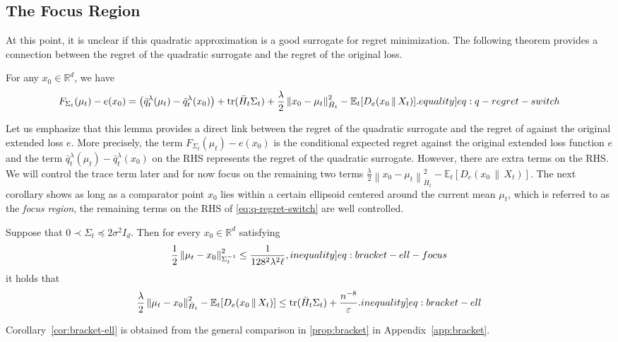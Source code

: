\documentclass[12pt,cleveref]{jmlr}
\newcommand{\eqlabel}[1]{\label[equality]{#1}}
\newcommand{\ineqlabel}[1]{\label[inequality]{#1}}
\newcommand{\R}{\mathbb R}
\newcommand{\E}{\mathbb E}
\newcommand{\tr}{\operatorname{tr}}
\newcommand{\1}{\mathbf 1}
\newcommand{\eps}{\varepsilon}
\newcommand{\normm}[2]{\left\lVert #1\right\rVert_{#2}}
\begin{document}
\subsection{The Focus Region}
At this point, it is unclear if this quadratic approximation is a good surrogate for regret minimization.
The following theorem provides a connection between the regret of the quadratic surrogate and the regret of the original loss.
\begin{lemma}
    \label{lem:regret-switch-main}
    For any $x_0 \in \R^d$, we have
    \begin{align}
        F_{\Sigma_t}(\mu_t) - e(x_0)
        =
        \bigl(\bar{q}_t^\lambda(\mu_t) - \bar{q}_t^\lambda(x_0)\bigr)
        +\tr(\bar{H}_t\Sigma_t)
        +\frac\lambda2\normm{x_0-\mu_t}{\bar{H}_t}^2
        -\E_t[D_e(x_0\,\|\,X_t)].
        \eqlabel{eq:q-regret-switch}
    \end{align}
\end{lemma}
Let us emphasize that this lemma provides a direct link between the regret of the quadratic surrogate and the regret of against the original extended loss $e$.
More precisely, the term $F_{\Sigma_t}(\mu_t) - e(x_0)$ is the conditional expected regret against the original extended loss function $e$ and
the term $\bar{q}_t^\lambda(\mu_t) - \bar{q}_t^\lambda(x_0)$ on the RHS represents the regret of the quadratic surrogate.
However, there are extra terms on the RHS.
We will control the trace term later and for now focus on the remaining two terms $\frac\lambda2\normm{x_0-\mu_t}{\bar{H}_t}^2 - \E_t[D_e(x_0\,\|\,X_t)]$.
The next corollary shows as long as a comparator point $x_0$ lies within a certain ellipsoid centered around the current mean $\mu_t$, which is referred to as the \textit{focus region}, the remaining terms on the RHS of \eqref{eq:q-regret-switch} are well controlled.
\begin{corollary}
    \label{cor:bracket-ell}
    Suppose that $0\prec\Sigma_t\preceq2\sigma^2I_d$.
    Then for every $x_0\in\R^d$ satisfying
    \begin{align}
        \frac12\normm{\mu_t-x_0}{\Sigma_t^{-1}}^2
        \leq\frac{1}{128^2\lambda^2\ell},
        \ineqlabel{eq:bracket-ell-focus}
    \end{align}
    it holds that
    \begin{align}
        \frac\lambda2\normm{\mu_t-x_0}{\bar{H}_t}^2
        -\E_t[D_e(x_0\,\|\,X_t)]
        \leq\tr(\bar{H}_t\Sigma_t)
        +\frac{n^{-8}}{\eps}.
        \ineqlabel{eq:bracket-ell}
    \end{align}
\end{corollary}
Corollary~\ref{cor:bracket-ell} is obtained from the general comparison in \cref{prop:bracket} in Appendix~\ref{app:bracket}.
\end{document}
